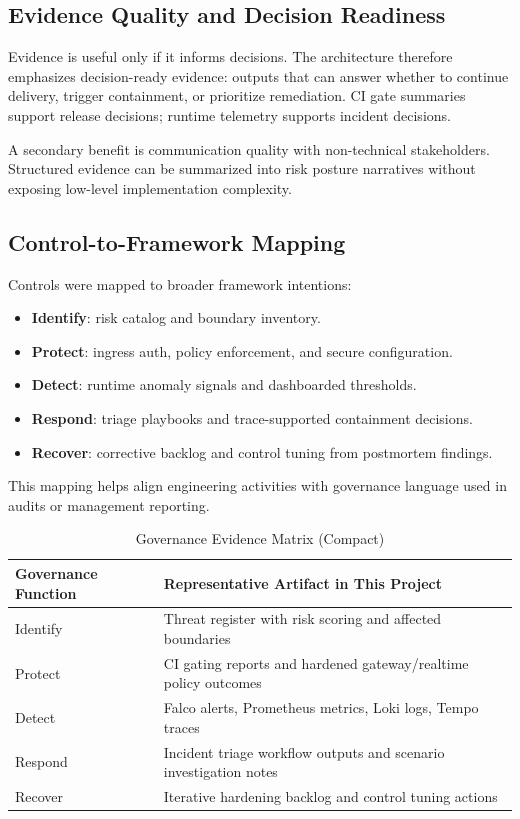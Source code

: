 \documentclass[conference]{IEEEtran}
\begin{document}
\subsection{Evidence Quality and Decision Readiness}
Evidence is useful only if it informs decisions. The architecture therefore emphasizes decision-ready evidence: outputs that can answer whether to continue delivery, trigger containment, or prioritize remediation. CI gate summaries support release decisions; runtime telemetry supports incident decisions.

A secondary benefit is communication quality with non-technical stakeholders. Structured evidence can be summarized into risk posture narratives without exposing low-level implementation complexity.

\subsection{Control-to-Framework Mapping}
Controls were mapped to broader framework intentions:
\begin{itemize}
\item \textbf{Identify}: risk catalog and boundary inventory.
\item \textbf{Protect}: ingress auth, policy enforcement, and secure configuration.
\item \textbf{Detect}: runtime anomaly signals and dashboarded thresholds.
\item \textbf{Respond}: triage playbooks and trace-supported containment decisions.
\item \textbf{Recover}: corrective backlog and control tuning from postmortem findings.
\end{itemize}

This mapping helps align engineering activities with governance language used in audits or management reporting.

\begin{table}[!t]
\caption{Governance Evidence Matrix (Compact)}
\centering
\footnotesize
\begin{tabularx}{\linewidth}{>{\raggedright\arraybackslash}p{1.1cm} Y}
\toprule
Governance Function & Representative Artifact in This Project \\
\midrule
Identify & Threat register with risk scoring and affected boundaries \\
Protect & CI gating reports and hardened gateway/realtime policy outcomes \\
Detect & Falco alerts, Prometheus metrics, Loki logs, Tempo traces \\
Respond & Incident triage workflow outputs and scenario investigation notes \\
Recover & Iterative hardening backlog and control tuning actions \\
\bottomrule
\end{tabularx}
\label{tab:governancematrix}
\end{table}
\end{document}
